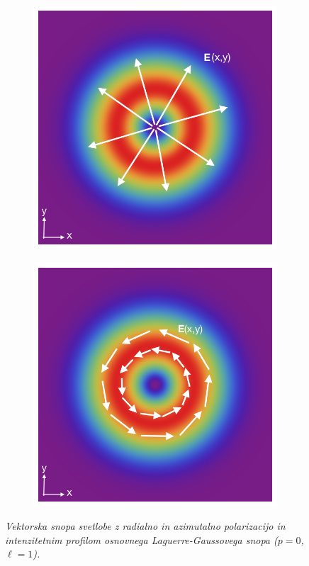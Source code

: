 \documentclass[longbibliography,slovene,a4paper,12pt]{book}
\begin{document}
\begin{figure}[h!]
	\centering
	\begin{subfigure}[b]{0.35\textwidth}
	\includegraphics[width=\textwidth]{slike/lg_01_radial.png}
	\label{fig:lg_01radialbeam}
	\end{subfigure}
	\quad
	\begin{subfigure}[b]{0.35\textwidth}
	\includegraphics[width=\textwidth]{slike/lg_01_azimuthal.png}
	\label{fig:lg_01azimuthalbeam}
	\end{subfigure}
	\caption{\emph{Vektorska snopa svetlobe z radialno in azimutalno polarizacijo in intenzitetnim profilom osnovnega Laguerre-Gaussovega snopa ($p=0$, $\ell = 1$).}}
\end{figure}
\end{document}
